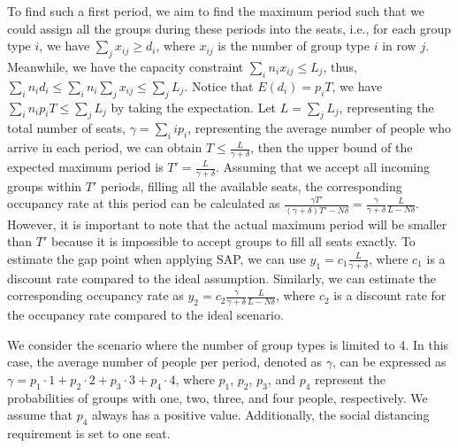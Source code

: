To find such a first period, we aim to find the maximum period such that we could assign all the groups during these periods into the seats, i.e., for each group type $i$, we have $\sum_{j} x_{ij} \geq d_i$, where $x_{ij}$ is the number of group type $i$ in row $j$. Meanwhile, we have the capacity constraint $\sum_{i} n_{i} x_{ij} \leq L_j$, thus, $\sum_{i} n_i d_i \leq \sum_{i} n_i \sum_{j} x_{ij} \leq \sum_{j} L_{j}$. Notice that $E(d_i) = p_i T$, we have $\sum_{i} n_i p_i T \leq \sum_{j} L_{j}$ by taking the expectation. Let $L = \sum_{j} L_{j}$, representing the total number of seats, $\gamma = \sum_{i} i p_i$, representing the average number of people who arrive in each period, we can obtain $T \leq \frac{L}{\gamma + \delta}$, then the upper bound of the expected maximum period is $T' = \frac{L}{\gamma + \delta}$.
Assuming that we accept all incoming groups within $T'$ periods, filling all the available seats, the corresponding occupancy rate at this period can be calculated as $\frac{\gamma T'}{(\gamma+ \delta)T' - N \delta} = \frac{\gamma}{\gamma +\delta} \frac{L}{L-N \delta}$. However, it is important to note that the actual maximum period will be smaller than $T{'}$ because it is impossible to accept groups to fill all seats exactly. To estimate the gap point when applying SAP, we can use $y_1 = c_1 \frac{L}{\gamma + \delta}$, where $c_1$ is a discount rate compared to the ideal assumption. Similarly, we can estimate the corresponding occupancy rate as $y_2 = c_2 \frac{\gamma}{\gamma +\delta} \frac{L}{L-N \delta}$, where $c_2$ is a discount rate for the occupancy rate compared to the ideal scenario.




We consider the scenario where the number of group types is limited to 4. In this case, the average number of people per period, denoted as $\gamma$, can be expressed as $\gamma = p_1 \cdot 1 + p_2 \cdot 2 + p_3 \cdot 3 + p_4 \cdot 4$, where $p_1$, $p_2$, $p_3$, and $p_4$ represent the probabilities of groups with one, two, three, and four people, respectively. We assume that $p_4$ always has a positive value. Additionally, the social distancing requirement is set to one seat.

